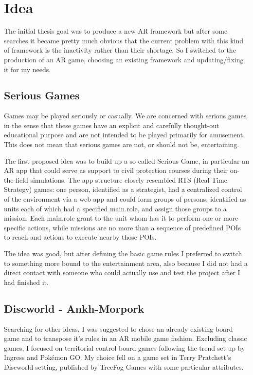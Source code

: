 \chapter{Idea}

	The initial thesis goal was to produce a new AR framework but after some searches it became pretty much obvious that the current problem with this kind of framework is the inactivity rather than their shortage.
	So I switched to the production of an AR game, choosing an existing framework and updating/fixing it for my needs.
	
	\section{Serious Games}
	
		\begin{quoting}
			Games may be played seriously or casually. We are concerned with serious games in the sense that these games have an explicit and carefully thought-out educational purpose and are not intended to be played primarily for amusement. This does not mean that serious games are not, or should not be, entertaining.~\cite{abt:serious}
		\end{quoting}
	
		The first proposed idea was to build up a so called Serious Game, in particular an AR app that could serve as support to civil protection courses during their on-the-field simulations.
		The app structure closely resembled RTS (Real Time Strategy) games: one person, identified as a strategist, had a centralized control of the environment via a web app and could form groups of persons, identified as units each of which had a specified main.role, and assign those groups to a mission.
		Each main.role grant to the unit whom has it to perform one or more specific actions, while missions are no more than a sequence of predefined POIs to reach and actions to execute nearby those POIs.
		
		The idea was good, but after defining the basic game rules I preferred to switch to something more bound to the entertainment area, also because I did not had a direct contact with someone who could actually use and test the project after I had finished it.
	
	\section{Discworld - Ankh-Morpork}
	
		Searching for other ideas, I was suggested to chose an already existing board game and to transpose it's rules in an AR mobile game fashion.
		Excluding classic games, I focused on territorial control board games following the trend set up by Ingress and Pokémon GO.
		My choice fell on a game set in Terry Pratchett's Discworld setting, published by TreeFog Games with some particular attributes.
		
